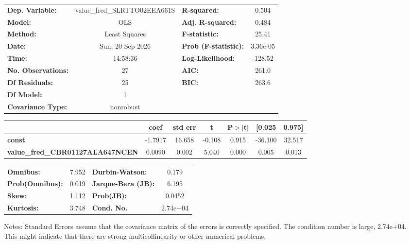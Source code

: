 \begin{center}
\begin{tabular}{lclc}
\toprule
\textbf{Dep. Variable:}                  & value\_fred\_SLRTTO02EEA661S & \textbf{  R-squared:         } &     0.504   \\
\textbf{Model:}                          &             OLS              & \textbf{  Adj. R-squared:    } &     0.484   \\
\textbf{Method:}                         &        Least Squares         & \textbf{  F-statistic:       } &     25.41   \\
\textbf{Date:}                           &       Sun, 20 Sep 2026       & \textbf{  Prob (F-statistic):} &  3.36e-05   \\
\textbf{Time:}                           &           14:58:36           & \textbf{  Log-Likelihood:    } &   -128.52   \\
\textbf{No. Observations:}               &                27            & \textbf{  AIC:               } &     261.0   \\
\textbf{Df Residuals:}                   &                25            & \textbf{  BIC:               } &     263.6   \\
\textbf{Df Model:}                       &                 1            & \textbf{                     } &             \\
\textbf{Covariance Type:}                &          nonrobust           & \textbf{                     } &             \\
\bottomrule
\end{tabular}
\begin{tabular}{lcccccc}
                                         & \textbf{coef} & \textbf{std err} & \textbf{t} & \textbf{P$> |$t$|$} & \textbf{[0.025} & \textbf{0.975]}  \\
\midrule
\textbf{const}                           &      -1.7917  &       16.658     &    -0.108  &         0.915        &      -36.100    &       32.517     \\
\textbf{value\_fred\_CBR01127ALA647NCEN} &       0.0090  &        0.002     &     5.040  &         0.000        &        0.005    &        0.013     \\
\bottomrule
\end{tabular}
\begin{tabular}{lclc}
\textbf{Omnibus:}       &  7.952 & \textbf{  Durbin-Watson:     } &    0.179  \\
\textbf{Prob(Omnibus):} &  0.019 & \textbf{  Jarque-Bera (JB):  } &    6.195  \\
\textbf{Skew:}          &  1.112 & \textbf{  Prob(JB):          } &   0.0452  \\
\textbf{Kurtosis:}      &  3.748 & \textbf{  Cond. No.          } & 2.74e+04  \\
\bottomrule
\end{tabular}
\end{center}

Notes: \newline
 [1] Standard Errors assume that the covariance matrix of the errors is correctly specified. \newline
 [2] The condition number is large, 2.74e+04. This might indicate that there are \newline
 strong multicollinearity or other numerical problems.